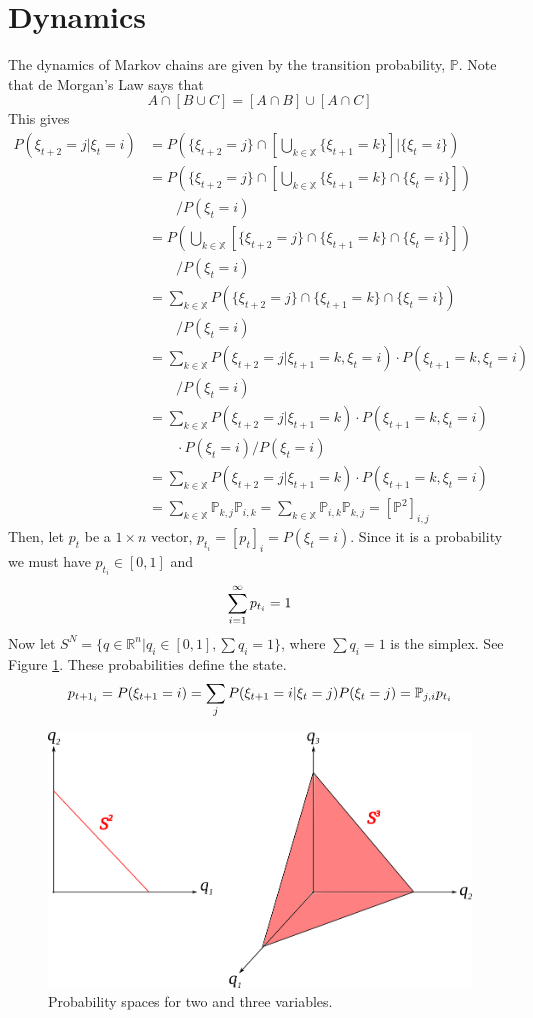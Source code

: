 \section{Dynamics}
The dynamics of Markov chains are given by the transition probability, $\mathbb{P}$. Note that de Morgan's Law says that
$$A\cap[B\cup C] = [A\cap B] \cup [A\cap C]$$
This gives
\begin{align*}
P\left(\xi_{t+2}=j | \xi_t=i\right) &= P\left(\{\xi_{t+2}=j\} \cap \left[\bigcup_{k\in\mathbb{X}}\{\xi_{t+1}=k\}\right] | \{\xi_t=i\}\right) \\
&= P\left(\{\xi_{t+2}=j\} \cap \left[\bigcup_{k\in\mathbb{X}}\{\xi_{t+1}=k\} \cap \{\xi_t=i\}\right]\right) \\
&\qquad / P(\xi_t=i) \\
&= P\left(\bigcup_{k\in\mathbb{X}}[\{\xi_{t+2}=j\} \cap \{\xi_{t+1}=k\} \cap \{\xi_t=i\}]\right) \\
&\qquad / P(\xi_t=i) \\
&= \sum_{k\in\mathbb{X}} P(\{\xi_{t+2}=j\} \cap \{\xi_{t+1}=k\} \cap \{\xi_t=i\}) \\
&\qquad / P(\xi_t=i) \\
&= \sum_{k\in\mathbb{X}} P(\xi_{t+2}=j | \xi_{t+1}=k,\xi_t=i) \cdot P(\xi_{t+1}=k,\xi_t=i) \\
&\qquad / P(\xi_t=i) \\
&= \sum_{k\in\mathbb{X}} P(\xi_{t+2}=j | \xi_{t+1}=k) \cdot P(\xi_{t+1}=k,\xi_t=i) \\
&\qquad \cdot P(\xi_t=i) / P(\xi_t=i) \\
&= \sum_{k\in\mathbb{X}} P(\xi_{t+2}=j | \xi_{t+1}=k) \cdot P(\xi_{t+1}=k,\xi_t=i) \\
&= \sum_{k\in\mathbb{X}} \mathbb{P}_{k,j}\mathbb{P}_{i,k} = \sum_{k\in\mathbb{X}} \mathbb{P}_{i,k}\mathbb{P}_{k,j} = \left[\mathbb{P}^2\right]_{i,j}
\end{align*}
Then, let $p_t$ be a $1\times n$ vector, $p_{t_i}=[p_t]_i=P(\xi_t=i)$. Since it is a probability we must have $p_{t_i}\in[0,1]$ and
$$\sum_{i=1}^\infty p_{t_i}=1$$
Now let $S^N=\{q\in\mathbb{R}^n|q_i\in[0,1],\sum q_i=1\}$, where $\sum q_i=1$ is the simplex. See Figure \ref{fig:09s2s3}. These probabilities define the state.
$$p_{{t+1}_i} = P(\xi_{t+1}=i) = \sum_jP(\xi_{t+1}=i|\xi_t=j)P(\xi_t=j) = \mathbb{P}_{j,i} p_{t_i}$$

\begin{figure}[ht!]
	\centering
	\includegraphics[width=.4\textwidth]{images/09s2s3}
	\caption{Probability spaces for two and three variables.}
	\label{fig:09s2s3}
\end{figure}

